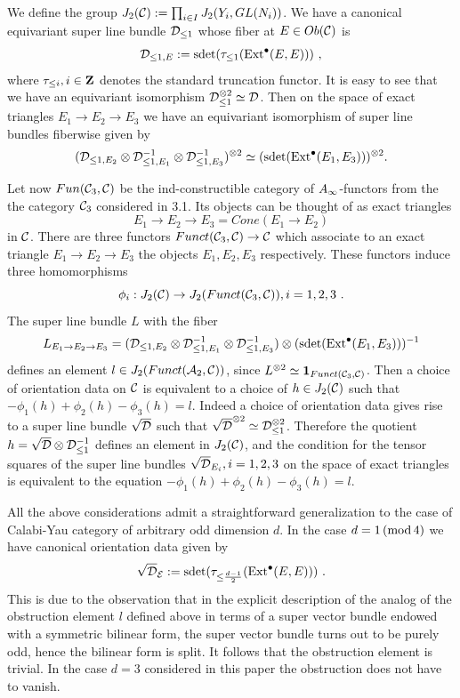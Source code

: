 \documentclass[12pt]{article}
\begin{document}
We define the group $J_2({\mathcal C}):=\prod_{i\in I} J_2(Y_i,GL(N_i))$. We have a canonical equivariant super line bundle ${\cal D}_{\le 1}$ whose fiber at $E\in Ob({\mathcal C})$ is
$${\cal D}_{\le 1,E}:=\operatorname{sdet}(\tau_{\le 1}(\operatorname{Ext}^{\bullet}(E,E)))\,\,,$$ where $\tau_{\le i}, i\in {\bf Z}$ denotes the standard truncation functor.
It is easy to see that we have an equivariant isomorphism ${\cal D}_{\le 1}^{\otimes 2}\simeq {\cal D}$. Then on the space of exact triangles $E_1\to E_2\to E_3$ we have an equivariant isomorphism of super line bundles fiberwise given by
$$({\cal D}_{{\le 1},E_2}\otimes {\cal D}_{{\le 1},E_1}^{-1}\otimes {\cal D}_{{\le 1},E_3}^{-1})^{\otimes 2}\simeq (\operatorname{sdet}(\operatorname{Ext}^{\bullet}(E_1,E_3)))^{\otimes 2}.$$

Let now $Fun({{\mathcal C}}_3, {\mathcal C})$ be the ind-constructible category of $A_{\infty}$-functors from the the category ${\mathcal C}_3$ considered in 3.1. Its objects can be thought of as exact triangles $$E_1\to E_2\to E_3=Cone(E_1\to E_2)$$ in ${\mathcal C}$. There are three functors $Funct({{\mathcal C}}_3, {\mathcal C})\to {\mathcal C}$ which associate to an exact triangle
$E_1\to E_2\to E_3$  the objects $E_1,E_2,E_3$ respectively. These functors induce three homomorphisms 
$$\phi_i: J_2({\mathcal C})\to J_2(Funct({\mathcal C}_3, {\mathcal C})), i=1,2,3\,\,.$$
 The super line bundle $L$ with the fiber
$$L_{E_1\to E_2\to E_3}=({\cal D}_{{\le 1},E_2}\otimes {\cal D}_{{\le 1},E_1}^{-1}\otimes {\cal D}_{{\le 1},E_3}^{-1})\otimes (\operatorname{sdet}(\operatorname{Ext}^{\bullet}(E_1,E_3)))^{-1}$$ defines an element $l\in J_2(Funct({\cal A}_2, {\mathcal C}))$, since
$L^{\otimes 2}\simeq {\bf 1}_{Funct({\mathcal C}_3, {\mathcal C})}$. Then a choice of orientation data on ${\mathcal C}$ is equivalent to a choice of $h\in J_2({\mathcal C})$ such that $-\phi_1(h)+\phi_2(h)-\phi_3(h)=l$. Indeed a choice of orientation data gives rise to a super line bundle $\sqrt{\cal D}$ such that $\sqrt{\cal D}^{\otimes 2}\simeq {\cal D}_{\le 1}^{\otimes 2}$. Therefore the quotient $h=\sqrt{\cal D}\otimes {\cal D}_{\le 1}^{-1}$ defines an element in $J_2({\mathcal C})$, and the condition for the tensor squares of the super line bundles $\sqrt{\cal D}_{E_i}, i=1,2,3$ on the space of exact triangles is equivalent to the equation $-\phi_1(h)+\phi_2(h)-\phi_3(h)=l$.

\begin{rmk} All the above considerations admit a straightforward generalization to the case of Calabi-Yau category of arbitrary odd dimension $d$. In the case $d=1\,(\operatorname{mod} 4)$ we have canonical orientation data given by
$$\sqrt{\cal D}_{\cal E}:=\operatorname{sdet}(\tau_{\le {d-1\over{2}}}(\operatorname{Ext}^{\bullet}(E,E)))\,\,.$$
 This is due to the observation that in the explicit description of the analog of the obstruction element $l$ defined above in terms of a super vector bundle endowed with a symmetric bilinear form, the super vector bundle turns out to be purely odd, hence the bilinear form is split. It follows that the obstruction element is trivial. In the case $d=3$ considered in this paper the obstruction does not have to vanish.


\end{rmk}
\end{document}
